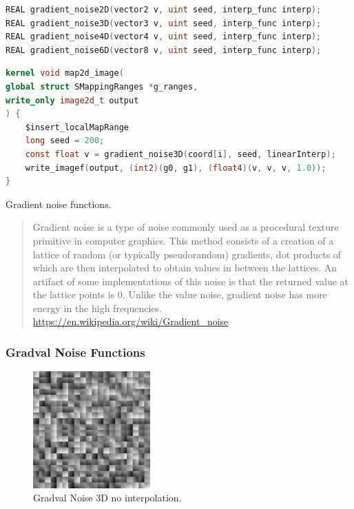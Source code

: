 \begin{lstlisting}[caption={Definition of gradient noise functions},label={lst:gradient_noise_definition},language=OpenCL]
REAL gradient_noise2D(vector2 v, uint seed, interp_func interp);
REAL gradient_noise3D(vector3 v, uint seed, interp_func interp);
REAL gradient_noise4D(vector4 v, uint seed, interp_func interp);
REAL gradient_noise6D(vector8 v, uint seed, interp_func interp);
\end{lstlisting}

\begin{lstlisting}[caption={Example for gradient noise functions},label={lst:gradient_noise_example},language=OpenCL]
kernel void map2d_image(
global struct SMappingRanges *g_ranges,
write_only image2d_t output
) {
    $insert_localMapRange
    long seed = 200;
    const float v = gradient_noise3D(coord[i], seed, linearInterp);
    write_imagef(output, (int2)(g0, g1), (float4)(v, v, v, 1.0));
}
\end{lstlisting}

Gradient noise functions.

\begin{quote}
Gradient noise is a type of noise commonly used as a procedural texture primitive in computer graphics.
This method consists of a creation of a lattice of random (or typically pseudorandom) gradients,
dot products of which are then interpolated to obtain values in between the lattices.
An artifact of some implementations of this noise is that the returned value at the lattice points is 0.
Unlike the value noise, gradient noise has more energy in the high frequencies.
\url{https://en.wikipedia.org/wiki/Gradient_noise}
\end{quote}

\subsubsection{Gradval Noise Functions}

\begin{figure}[h]
\centering
\includegraphics[width=0.4\textwidth]{out/noise_functions/gradval_noise3D_noInterp.png}
\caption{Gradval Noise 3D no interpolation.}
\label{fig:gradval_noise3D_noInterp}
\end{figure}

